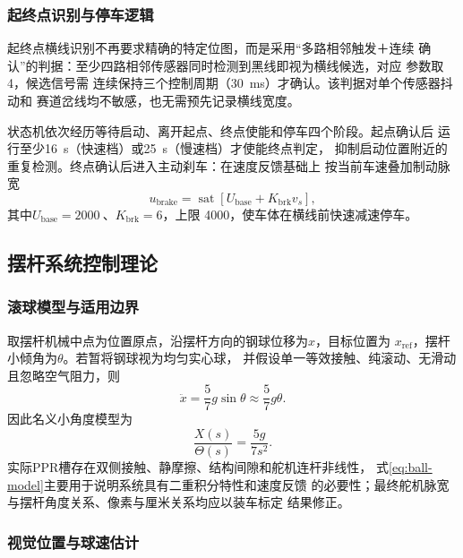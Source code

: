 \subsubsection{起终点识别与停车逻辑}

起终点横线识别不再要求精确的特定位图，而是采用“多路相邻触发＋连续
确认”的判据：至少四路相邻传感器同时检测到黑线即视为横线候选，对应
参数取4，候选信号需
连续保持三个控制周期（\SI{30}{ms}）才确认。该判据对单个传感器抖动和
赛道岔线均不敏感，也无需预先记录横线宽度。

状态机依次经历等待启动、离开起点、终点使能和停车四个阶段。起点确认后
运行至少\SI{16}{s}（快速档）或\SI{25}{s}（慢速档）才使能终点判定，
抑制启动位置附近的重复检测。终点确认后进入主动刹车：在速度反馈基础上
按当前车速叠加制动脉宽
\begin{equation}
  u_{\mathrm{brake}}=
  \operatorname{sat}\!\left[U_{\mathrm{base}}+K_{\mathrm{brk}}v_s\right],
  \label{eq:brake}
\end{equation}
其中$U_{\mathrm{base}}=\SI{2000}{}$、$K_{\mathrm{brk}}=6$，上限
\SI{4000}{}，使车体在横线前快速减速停车。

\subsection{摆杆系统控制理论}

\subsubsection{滚球模型与适用边界}

取摆杆机械中点为位置原点，沿摆杆方向的钢球位移为$x$，目标位置为
$x_{\mathrm{ref}}$，摆杆小倾角为$\theta$。若暂将钢球视为均匀实心球，
并假设单一等效接触、纯滚动、无滑动且忽略空气阻力，则
\begin{equation}
  \ddot{x}=\frac{5}{7}g\sin\theta
  \approx\frac{5}{7}g\theta.
  \label{eq:ball-model}
\end{equation}
因此名义小角度模型为
\begin{equation}
  \frac{X(s)}{\Theta(s)}=\frac{5g}{7s^2}.
  \label{eq:ball-transfer}
\end{equation}
实际PPR槽存在双侧接触、静摩擦、结构间隙和舵机连杆非线性，
式\eqref{eq:ball-model}主要用于说明系统具有二重积分特性和速度反馈
的必要性；最终舵机脉宽与摆杆角度关系、像素与厘米关系均应以装车标定
结果修正。

\subsubsection{视觉位置与球速估计}

